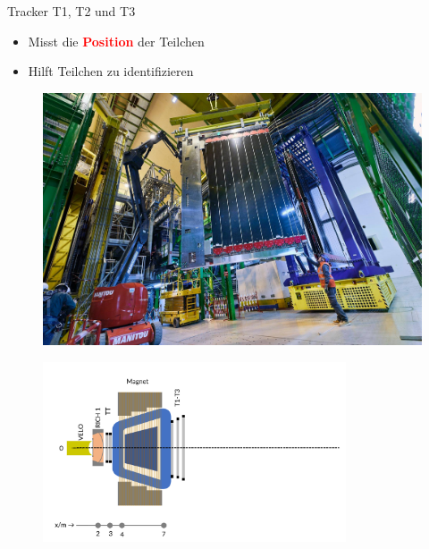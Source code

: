 \begin{frame}{Tracker T1, T2 und T3}
    \begin{minipage}{0.58\textwidth}
    \begin{itemize}
        \item Misst die \textcolor{red}{\textbf{Position}} der Teilchen
        \item Hilft Teilchen zu identifizieren %
    \end{itemize}
    \end{minipage}\hfill
    \begin{minipage}{0.38\textwidth}
        \begin{figure}[h]
        \centering
        \includegraphics[height=2.5 cm]{Figures Introductory Lecture/LHCb Detector/LHCb_T1-3.jpg} %
        \end{figure}
    \end{minipage}
    \vspace{-0.5cm}
    \begin{figure}[h]
    \centering
    \includegraphics[width=0.8\textwidth]{Figures Introductory Lecture/LHCb Detector/LHCb_5_DE.png}
    \end{figure}
\end{frame}
